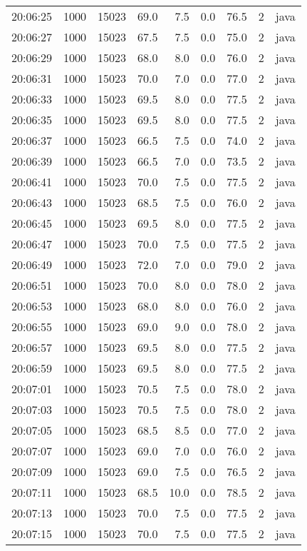 \documentclass[11pt]{article}
\begin{document}
\begin{table}[htbp]
\begin{tabular}{rrrrrrrrl}
20:06:25 & 1000 & 15023 & 69.0 & 7.5 & 0.0 & 76.5 & 2 & java\\
20:06:27 & 1000 & 15023 & 67.5 & 7.5 & 0.0 & 75.0 & 2 & java\\
20:06:29 & 1000 & 15023 & 68.0 & 8.0 & 0.0 & 76.0 & 2 & java\\
20:06:31 & 1000 & 15023 & 70.0 & 7.0 & 0.0 & 77.0 & 2 & java\\
20:06:33 & 1000 & 15023 & 69.5 & 8.0 & 0.0 & 77.5 & 2 & java\\
20:06:35 & 1000 & 15023 & 69.5 & 8.0 & 0.0 & 77.5 & 2 & java\\
20:06:37 & 1000 & 15023 & 66.5 & 7.5 & 0.0 & 74.0 & 2 & java\\
20:06:39 & 1000 & 15023 & 66.5 & 7.0 & 0.0 & 73.5 & 2 & java\\
20:06:41 & 1000 & 15023 & 70.0 & 7.5 & 0.0 & 77.5 & 2 & java\\
20:06:43 & 1000 & 15023 & 68.5 & 7.5 & 0.0 & 76.0 & 2 & java\\
20:06:45 & 1000 & 15023 & 69.5 & 8.0 & 0.0 & 77.5 & 2 & java\\
20:06:47 & 1000 & 15023 & 70.0 & 7.5 & 0.0 & 77.5 & 2 & java\\
20:06:49 & 1000 & 15023 & 72.0 & 7.0 & 0.0 & 79.0 & 2 & java\\
20:06:51 & 1000 & 15023 & 70.0 & 8.0 & 0.0 & 78.0 & 2 & java\\
20:06:53 & 1000 & 15023 & 68.0 & 8.0 & 0.0 & 76.0 & 2 & java\\
20:06:55 & 1000 & 15023 & 69.0 & 9.0 & 0.0 & 78.0 & 2 & java\\
20:06:57 & 1000 & 15023 & 69.5 & 8.0 & 0.0 & 77.5 & 2 & java\\
20:06:59 & 1000 & 15023 & 69.5 & 8.0 & 0.0 & 77.5 & 2 & java\\
20:07:01 & 1000 & 15023 & 70.5 & 7.5 & 0.0 & 78.0 & 2 & java\\
20:07:03 & 1000 & 15023 & 70.5 & 7.5 & 0.0 & 78.0 & 2 & java\\
20:07:05 & 1000 & 15023 & 68.5 & 8.5 & 0.0 & 77.0 & 2 & java\\
20:07:07 & 1000 & 15023 & 69.0 & 7.0 & 0.0 & 76.0 & 2 & java\\
20:07:09 & 1000 & 15023 & 69.0 & 7.5 & 0.0 & 76.5 & 2 & java\\
20:07:11 & 1000 & 15023 & 68.5 & 10.0 & 0.0 & 78.5 & 2 & java\\
20:07:13 & 1000 & 15023 & 70.0 & 7.5 & 0.0 & 77.5 & 2 & java\\
20:07:15 & 1000 & 15023 & 70.0 & 7.5 & 0.0 & 77.5 & 2 & java\\

\end{tabular}
\end{table}
\end{document}
